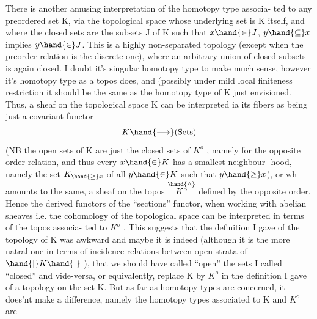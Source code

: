 
There is another amusing interpretation of the homotopy type associa-%
ted to any preordered set K,  via the topological space whose underlying
\margin{$\times$} set is K itself,  and where the closed sets are the subsets J of K
such that  $x \hand{\in} J$,  $y \hand{\subseteq} x$ implies $y \hand{\in} J$.  This is a highly non-separated
topology  (except when the preorder relation is the discrete one),  where
an arbitrary union of closed subsets is again closed.  I doubt it's
singular homotopy type to make much sense,  however it's  homotopy type
as a topos does,  and (possibly under mild loc\unsure{\hand{-}}al finiteness restriction\hand{)}
it should be the same as the homotopy type of K just envisioned.  Thus,
a sheaf on the topological space K   can be interpreted 
ia its fibers as being just a \uline{covariant} functor
\[ K \hand{\longrightarrow} (\text{Sets}) \]
(NB  the open sets of K are just the closed sets of $K^{o}$ , namely for the
opposite order relation,  and thus every $x \hand{\in} K$ has a smallest neighbour-%
hood,  namely the set  $K_{\hand{\geq} x}$  of all $y \hand{\in} K$ such that $y \hand{\geq} x$),  or wh
amounts to the same,  a sheaf on the topos  $\overset{\hand{\wedge}}{K^{o}}$  defined by the opposite
order.  Hence the derived functors of the ``sections'' functor,  when
working with abelian sheaves   i.e.  the cohomology of the
topological space  can be interpreted in terms of the topos associa-%
ted to $K^{o}$ .  This suggests that the definition I gave of the topology
of K was awkward and maybe it is indeed (although it is the more natral
one in terms of incidence relations between open strata of $\hand{|}K\hand{|}$ ), that
we should have called ``open'' the sets I called ``closed'' and vide-versa,
or equivalently,  replace K by $K^{o}$ in the definition I gave of a topology
on the set K.  But as far as homotopy types are concerned, it does'nt
make a difference,  namely the homotopy types associated to K and $K^{o}$ are
